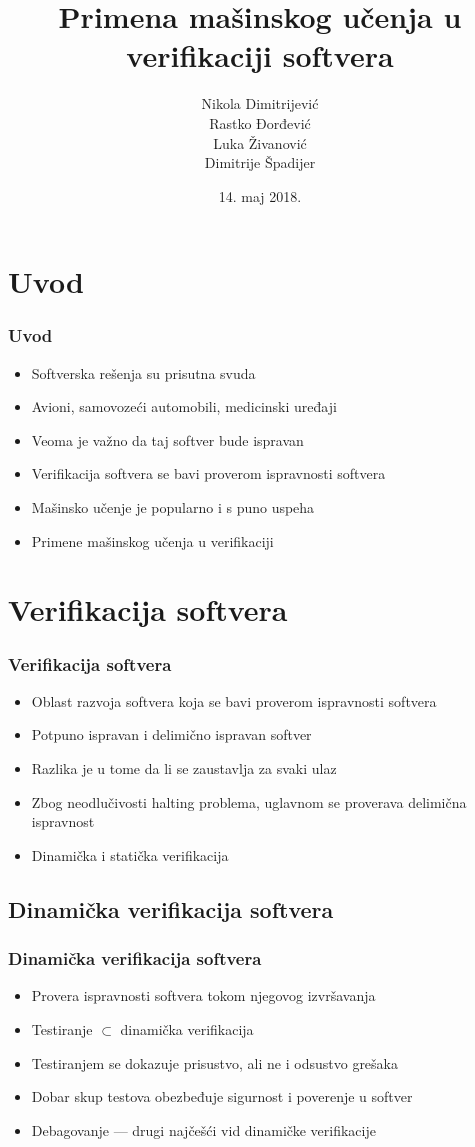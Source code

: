 \documentclass[11pt]{beamer}
\title{Primena mašinskog učenja u verifikaciji softvera}
\author[\hspace{-0.8em}N. Dimitrijević, R. Đorđević, L. Živanović, D. Špadijer]
		{Nikola Dimitrijević\\ %
        Rastko Đorđević\\ %
        Luka Živanović\\ %
        Dimitrije Špadijer} %
\date{14. maj 2018.}
\theoremstyle{definition}
\begin{document}
\begin{frame}
\titlepage
\end{frame}

\section{Uvod}
\label{sec:uvod}
\begin{frame}
\frametitle{Uvod}
\begin{itemize}
\item Softverska rešenja su prisutna svuda
\item Avioni, samovozeći automobili, medicinski uređaji
\item Veoma je važno da taj softver bude ispravan
\item Verifikacija softvera se bavi proverom ispravnosti softvera
\item Mašinsko učenje je popularno i s puno uspeha
\item Primene mašinskog učenja u verifikaciji
\end{itemize}

\end{frame}
\section{Verifikacija softvera}
\label{sec:verifikacija}
\begin{frame}
\frametitle{Verifikacija softvera}
\begin{itemize}
\item Oblast razvoja softvera koja se bavi proverom ispravnosti softvera
\item Potpuno ispravan i delimično ispravan softver
\item Razlika je u tome da li se zaustavlja za svaki ulaz
\item Zbog neodlučivosti halting problema, uglavnom se proverava delimična ispravnost
\item Dinamička i statička verifikacija
\end{itemize}
\end{frame}

\subsection{Dinamička verifikacija softvera}
\label{subsec:dinamicka}
\begin{frame}
\frametitle{Dinamička verifikacija softvera}
\begin{itemize}
\item Provera ispravnosti softvera tokom njegovog izvršavanja
\item Testiranje $\subset$ dinamička verifikacija
\item Testiranjem se dokazuje prisustvo, ali ne i odsustvo grešaka
\item Dobar skup testova obezbeđuje sigurnost i poverenje u softver
\item Debagovanje --- drugi najčešći vid dinamičke verifikacije
\end{itemize}
\end{frame}
\end{document}
